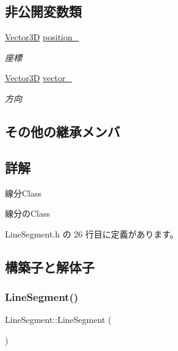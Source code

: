 \subsection*{非公開変数類}
\begin{DoxyCompactItemize}
\item 
\mbox{\hyperlink{class_vector3_d}{Vector3D}} \mbox{\hyperlink{class_line_segment_a2b62cbe86bc97fccece2b098d83d643e}{position\+\_\+}}
\begin{DoxyCompactList}\small\item\em 座標 \end{DoxyCompactList}\item 
\mbox{\hyperlink{class_vector3_d}{Vector3D}} \mbox{\hyperlink{class_line_segment_a8a0af480c7798ce5d9975dce984cae38}{vector\+\_\+}}
\begin{DoxyCompactList}\small\item\em 方向 \end{DoxyCompactList}\end{DoxyCompactItemize}
\subsection*{その他の継承メンバ}


\subsection{詳解}
線分\+Class 

線分の\+Class 

 Line\+Segment.\+h の 26 行目に定義があります。



\subsection{構築子と解体子}
\mbox{\label{class_line_segment_a4c2da2ff2d3979f28bfcb24948a8e6a9}} 
\subsubsection{\texorpdfstring{Line\+Segment()}{LineSegment()}}
{\footnotesize\ttfamily Line\+Segment\+::\+Line\+Segment (\begin{DoxyParamCaption}{ }\end{DoxyParamCaption})\hspace{0.3cm}{\ttfamily [inline]}}



